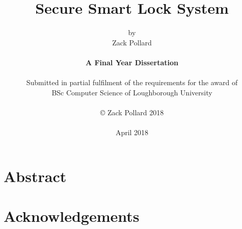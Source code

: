 
\title{Secure Smart Lock System}

\author{by\\Zack Pollard\\
\\
{\bf A Final Year Dissertation}\\
\\
Submitted in partial fulfilment of the requirements for the award of\\
BSc Computer Science of Loughborough University\\
\\
\copyright
\hspace{1 dd} Zack Pollard 2018\\
\\
April 2018
}
\date{} %

\maketitle


%
%

\chapter*{Abstract}


\chapter*{Acknowledgements}

